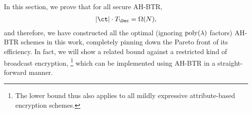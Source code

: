 In this section, we prove that for all secure AH-BTR,
\begin{align*}
|\ct|\cdot T_\Dec=\bigOmega(N),
\end{align*}
and therefore, we have constructed all the optimal (ignoring $\operatorname{poly}(\lambda)$ factors) AH-BTR schemes in this work, completely pinning down the Pareto front of its efficiency.
In fact, we will show a related bound against a restricted kind of broadcast encryption,%
\footnote{The lower bound thus also applies to
all mildly expressive attribute-based encryption schemes.}
which can be implemented using AH-BTR in a straight-forward manner.
